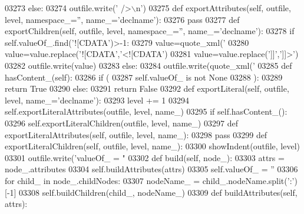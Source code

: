 \begin{DoxyCode}
{{{{{{{{{{{{{{{{{{{{{{{{{{{{{{{{{{{{{{{{{{{{{{{{{{{{{{{{{{{{{{{{{{{{{{{{{{{{{{{{{{{{{{{{{{{{{{{{{{{{{{{{{{{{{{{{{{{{{{{{{{{{{{{{{{{{{{{{{{{{{{{{{{{{{{{{{{{{{{{{{{{{{{{{{{{{{{{{{{{{{{{{{{{{{{{{{{{{{{{{{{{{{{{{{{{{{{{03273         \textcolor{keywordflow}{else}:
03274             outfile.write(\textcolor{stringliteral}{' />\(\backslash\)n'})
03275     \textcolor{keyword}{def }exportAttributes(self, outfile, level, namespace\_='', name\_='declname'):
03276         \textcolor{keywordflow}{pass}
03277     \textcolor{keyword}{def }exportChildren(self, outfile, level, namespace\_='', name\_='declname'):
03278         \textcolor{keywordflow}{if} self.valueOf\_.find(\textcolor{stringliteral}{'![CDATA'})>-1:
03279             value=quote_xml(\textcolor{stringliteral}{'%
03280             value=value.replace(\textcolor{stringliteral}{'![CDATA'},\textcolor{stringliteral}{'<![CDATA'})
03281             value=value.replace(\textcolor{stringliteral}{']]'},\textcolor{stringliteral}{']]>'})
03282             outfile.write(value)
03283         \textcolor{keywordflow}{else}:
03284             outfile.write(quote_xml(\textcolor{stringliteral}{'%
03285     \textcolor{keyword}{def }hasContent_(self):
03286         \textcolor{keywordflow}{if} (
03287             self.valueOf_ \textcolor{keywordflow}{is} \textcolor{keywordflow}{not} \textcolor{keywordtype}{None}
03288             ):
03289             \textcolor{keywordflow}{return} \textcolor{keyword}{True}
03290         \textcolor{keywordflow}{else}:
03291             \textcolor{keywordflow}{return} \textcolor{keyword}{False}
03292     \textcolor{keyword}{def }exportLiteral(self, outfile, level, name\_='declname'):
03293         level += 1
03294         self.exportLiteralAttributes(outfile, level, name\_)
03295         \textcolor{keywordflow}{if} self.hasContent_():
03296             self.exportLiteralChildren(outfile, level, name\_)
03297     \textcolor{keyword}{def }exportLiteralAttributes(self, outfile, level, name\_):
03298         \textcolor{keywordflow}{pass}
03299     \textcolor{keyword}{def }exportLiteralChildren(self, outfile, level, name\_):
03300         showIndent(outfile, level)
03301         outfile.write(\textcolor{stringliteral}{'valueOf\_ = "%
03302     \textcolor{keyword}{def }build(self, node\_):
03303         attrs = node\_.attributes
03304         self.buildAttributes(attrs)
03305         self.valueOf_ = \textcolor{stringliteral}{''}
03306         \textcolor{keywordflow}{for} child\_ \textcolor{keywordflow}{in} node\_.childNodes:
03307             nodeName\_ = child\_.nodeName.split(\textcolor{stringliteral}{':'})[-1]
03308             self.buildChildren(child\_, nodeName\_)
03309     \textcolor{keyword}{def }buildAttributes(self, attrs):
}}}}}}}}}}}}}}}}}}}}}}}}}}}}}}}}}}}}}}}}}}}}}}}}}}}}}}}}}}}}}}}}}}}}}}}}}}}}}}}}}}}}}}}}}}}}}}}}}}}}}}}}}}}}}}}}}}}}}}}}}}}}}}}}}}}}}}}}}}}}}}}}}}}}}}}}}}}}}}}}}}}}}}}}}}}}}}}}}}}}}}}}}}}}}}}}}}}}}}}}}}}}}}}}}}}}}}}}}}
\end{DoxyCode}
